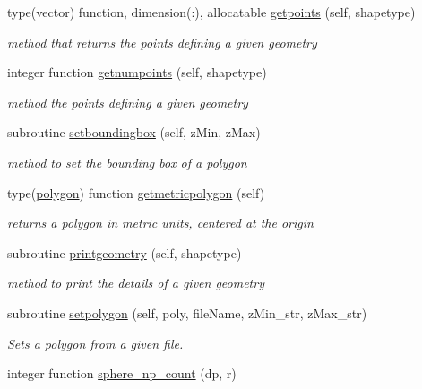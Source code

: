 \begin{DoxyCompactItemize}
type(vector) function, dimension(\+:), allocatable \mbox{\hyperlink{namespacegeometry__mod_a0b1a3c5aa414292ace34d59487082e3a}{getpoints}} (self, shapetype)
\begin{DoxyCompactList}\small\item\em method that returns the points defining a given geometry \end{DoxyCompactList}\item 
integer function \mbox{\hyperlink{namespacegeometry__mod_a524c5d28a80fb6729b102126485605ce}{getnumpoints}} (self, shapetype)
\begin{DoxyCompactList}\small\item\em method the points defining a given geometry \end{DoxyCompactList}\item 
subroutine \mbox{\hyperlink{namespacegeometry__mod_a41e0a6999c6edccb70fe20ec80d32709}{setboundingbox}} (self, z\+Min, z\+Max)
\begin{DoxyCompactList}\small\item\em method to set the bounding box of a polygon \end{DoxyCompactList}\item 
type(\mbox{\hyperlink{structgeometry__mod_1_1polygon}{polygon}}) function \mbox{\hyperlink{namespacegeometry__mod_aee5a288df947e30d7e46c37a2f7ca9d2}{getmetricpolygon}} (self)
\begin{DoxyCompactList}\small\item\em returns a polygon in metric units, centered at the origin \end{DoxyCompactList}\item 
subroutine \mbox{\hyperlink{namespacegeometry__mod_aed4426181ca851b41717edd50268e5f3}{printgeometry}} (self, shapetype)
\begin{DoxyCompactList}\small\item\em method to print the details of a given geometry \end{DoxyCompactList}\item 
subroutine \mbox{\hyperlink{namespacegeometry__mod_a14008da67dcaf75e468b4487f0d96ef4}{setpolygon}} (self, poly, file\+Name, z\+Min\+\_\+str, z\+Max\+\_\+str)
\begin{DoxyCompactList}\small\item\em Sets a polygon from a given file. \end{DoxyCompactList}\item 
integer function \mbox{\hyperlink{namespacegeometry__mod_a05de7940b4e7df5a2b31f3d0414e3743}{sphere\+\_\+np\+\_\+count}} (dp, r)

\end{DoxyCompactItemize}
